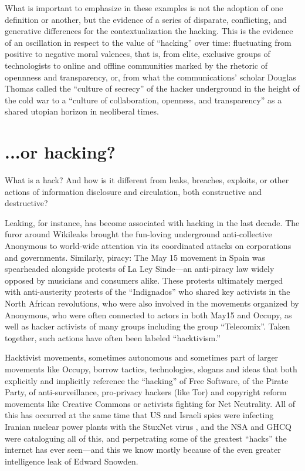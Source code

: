 \documentclass[10pt,letter,oneside]{scrartcl}
\begin{document}
What is important to emphasize in these examples is not the adoption of one
definition or another, but the evidence of a series of disparate, conflicting,
and generative differences for the contextualization the hacking. This is the
evidence of an oscillation in respect to the value of ``hacking'' over time:
fluctuating from positive to negative moral valences, that is, from elite,
exclusive groups of technologists to online and offline communities marked by
the rhetoric of opennness and transparency, or, from what the communications'
scholar Douglas Thomas called the ``culture of secrecy'' of the hacker
underground in the height of the cold war to a ``culture of collaboration,
openness, and transparency'' as a shared utopian horizon in neoliberal times.

\section*{...or hacking?}

What is a hack?  And how is it different from leaks, breaches, exploits, or
other actions of information disclosure and circulation, both constructive and
destructive?

Leaking, for instance, has become associated with hacking in the last decade.
The furor around Wikileaks brought the fun-loving underground anti-collective
Anonymous to world-wide attention via its coordinated attacks on corporations
and governments.  Similarly, piracy: The May 15 movement in Spain was
spearheaded alongside protests of La Ley Sinde---an anti-piracy law widely
opposed by musicians and consumers alike.  These protests ultimately merged with
anti-austerity protests of the ``Indignados'' who shared key activists in the
North African revolutions, who were also involved in the movements organized by
Anonymous, who were often connected to actors in both May15 and Occupy, as well
as hacker activists of many groups including the group ``Telecomix''.  Taken
together, such actions have often been labeled ``hacktivism.''

Hacktivist movements, sometimes autonomous and sometimes part of larger
movements like Occupy, borrow tactics, technologies, slogans and ideas that both
explicitly and implicitly reference the ``hacking'' of Free Software, of the
Pirate Party, of anti-surveillance, pro-privacy hackers (like Tor) and copyright
reform movements like Creative Commons or activists fighting for Net
Neutrality. All of this has occurred at the same time that US and Israeli spies
were infecting Iranian nuclear power plants with the StuxNet virus
\parencite{zetter_countdown_2014}, and the NSA and GHCQ were cataloguing all of this,
and perpetrating some of the greatest ``hacks'' the internet has ever seen---and
this we know mostly because of the even greater intelligence leak of Edward
Snowden.
\end{document}
